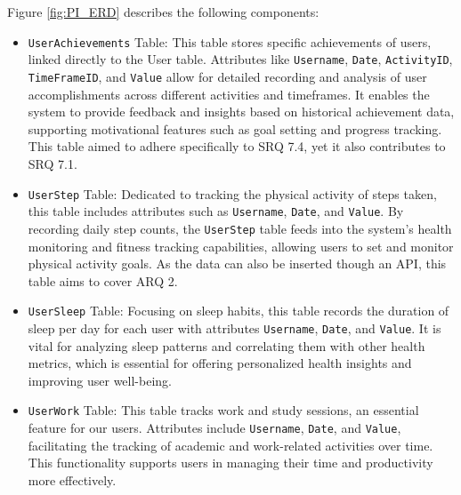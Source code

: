 \documentclass[12pt]{article}
\begin{document}
Figure \ref{fig:PI_ERD} describes the following components:

\begin{itemize}

    \item \texttt{UserAchievements} Table: This table stores specific
        achievements of users, linked directly to the User table. Attributes
        like \texttt{Username}, \texttt{Date}, \texttt{ActivityID}, \texttt{TimeFrameID}, and \texttt{Value} allow for
        detailed recording and analysis of user accomplishments across
        different activities and timeframes. It enables the system to provide
        feedback and insights based on historical achievement data, supporting
        motivational features such as goal setting and progress tracking. This 
        table aimed to adhere specifically to SRQ 7.4, yet it also contributes to SRQ 7.1.\par

    \item \texttt{UserStep} Table: Dedicated to tracking the physical activity
        of steps taken, this table includes attributes such as \texttt{Username}, \texttt{Date},
        and \texttt{Value}. By recording daily step counts, the \texttt{UserStep} table feeds
        into the system’s health monitoring and fitness tracking capabilities,
        allowing users to set and monitor physical activity goals. As the data 
        can also be inserted though an API, this table aims to cover ARQ 2.\par

    \item \texttt{UserSleep} Table: Focusing on sleep habits, this table
        records the duration of sleep per day for each user with attributes
        \texttt{Username}, \texttt{Date}, and \texttt{Value}. It is vital for analyzing sleep patterns
        and correlating them with other health metrics, which is essential for
        offering personalized health insights and improving user
        well-being.\par

    \item \texttt{UserWork} Table: This table tracks work and study sessions,
        an essential feature for our users. Attributes include
        \texttt{Username}, \texttt{Date}, and \texttt{Value}, facilitating the tracking of
        academic and work-related activities over time. This functionality
        supports users in managing their time and productivity more
        effectively.\par


\end{itemize}
\end{document}
